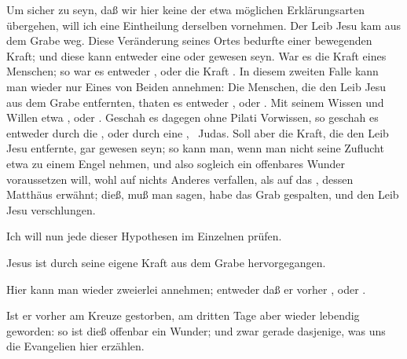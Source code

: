 \begin{aufza}
\item {}\par
Um sicher zu seyn, daß wir hier keine der etwa möglichen Erklärungsarten übergehen, will ich eine  Eintheilung derselben vornehmen. Der Leib Jesu kam aus dem Grabe weg. Diese Veränderung seines Ortes bedurfte einer bewegenden Kraft; und diese kann entweder eine  oder  gewesen seyn. War es die Kraft eines Menschen; so war es entweder , oder die Kraft . In diesem zweiten Falle kann man wieder nur Eines von Beiden annehmen: Die Menschen, die den Leib Jesu aus dem Grabe entfernten, thaten es entweder , oder . Mit seinem Wissen und Willen etwa , oder . Geschah es dagegen ohne Pilati Vorwissen, so geschah es entweder durch die , oder durch eine , \zB\ Judas. Soll aber die Kraft, die den Leib Jesu entfernte, gar  gewesen seyn; so kann man, wenn man nicht seine Zuflucht etwa zu einem Engel nehmen, und also sogleich ein offenbares Wunder voraussetzen will, wohl auf nichts Anderes verfallen, als auf das , dessen Matthäus erwähnt; dieß, muß man sagen, habe das Grab gespalten, und den Leib Jesu verschlungen.\par
Ich will nun jede dieser Hypothesen im Einzelnen prüfen.
\begin{aufzb}
\item Jesus ist durch seine eigene Kraft aus dem Grabe hervorgegangen.\par
Hier kann man wieder zweierlei annehmen; entweder daß er vorher , oder .
\begin{aufzc}
\item Ist er vorher am Kreuze gestorben, am dritten Tage aber wieder lebendig geworden: so ist dieß offenbar ein Wunder; und zwar gerade dasjenige, was uns die Evangelien hier erzählen.

\end{aufzc}
\end{aufzb}
\end{aufza}
